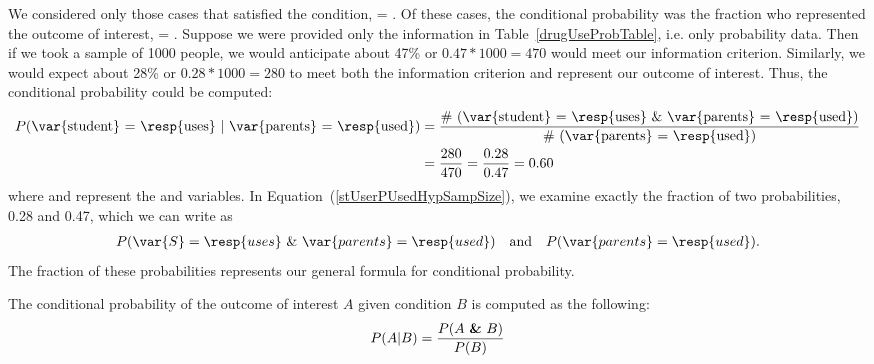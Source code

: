 We considered only those cases that satisfied the condition,  = . Of these cases, the conditional probability was the fraction who represented the outcome of interest,  = . Suppose we were provided only the information in Table~\vref{drugUseProbTable}, i.e. only probability data. Then if we took a sample of 1000 people, we would anticipate about 47\% or $0.47*1000 = 470$ would meet our information criterion. Similarly, we would expect about 28\% or $0.28*1000 = 280$ to meet both the information criterion and represent our outcome of interest. Thus, the conditional probability could be computed:
\begin{align}
P(\text{\var{student} = \resp{uses} } | \text{ \var{parents} = \resp{used}})
	&= \frac{\text{\# (\var{student} = \resp{uses} \& \var{parents} = \resp{used})}}{\text{\# (\var{parents} = \resp{used})}} \notag \\
	&= \frac{280}{470} = \frac{0.28}{0.47} = 0.60
\label{stUserPUsedHypSampSize}
\end{align}
where  and  represent the  and  variables. In Equation~(\ref{stUserPUsedHypSampSize}), we examine exactly the fraction of two probabilities, 0.28 and 0.47, which we can write as
\begin{align*}
P(\var{S} = \resp{uses}\ \&\ \var{parents} = \resp{used})
	\quad\text{and}\quad
	P(\var{parents} = \resp{used}).
\end{align*}
The fraction of these probabilities represents our general formula for conditional probability.

\begin{termBox}{
The conditional probability of the outcome of interest $A$ given condition $B$ is computed as the following: \vspace{-1.5mm}
\begin{eqnarray}
P(A | B) = \frac{P(A\text{ \textbf{\&} }B)}{P(B)}
\label{condProbEq}
\end{eqnarray}}
\end{termBox}

\vspace{-9mm}

